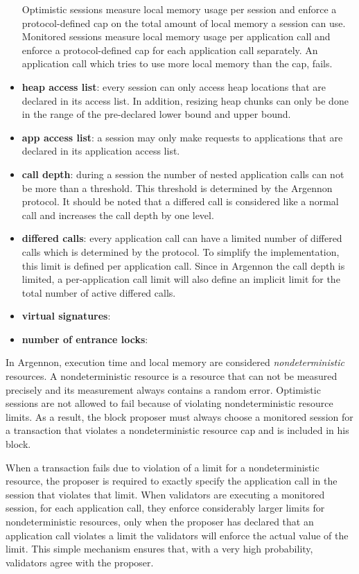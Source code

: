 \begin{itemize}
    Optimistic sessions measure local memory usage per session and enforce a protocol-defined cap on the total amount
    of local memory a session can use. Monitored sessions measure local memory usage per
    application call and enforce a protocol-defined cap for each application call separately. An application call
    which tries to use more local memory than the cap, fails.
    \item \textbf{heap access list}:
    every session can only access heap locations that are declared in its access list. In addition,
    resizing heap chunks can only be done in the range of the pre-declared lower bound and upper bound.
    \item \textbf{app access list}:
    a session may only make requests to applications that are declared in its application access list.
    \item \textbf{call depth}:
    during a session the number of nested application calls can not be more than a threshold. This threshold is
    determined by the Argennon protocol. It should be noted that a differed call is considered like a normal call and
    increases the call depth by one level.
    \item \textbf{differed calls}:
    every application call can have a limited number of differed calls which is determined by the protocol.
    To simplify the implementation, this limit is defined per application call. Since in Argennon the call depth is
    limited, a per-application call limit will also define an implicit limit for the total number of active differed
    calls.
    \item \textbf{virtual signatures}:
    \item \textbf{number of entrance locks}:
\end{itemize}

In Argennon, execution time and local memory are considered \emph{nondeterministic} resources. A nondeterministic
resource is a resource that can not be measured precisely and its measurement always contains a random error.
Optimistic sessions are not allowed to fail because of violating nondeterministic resource limits. As a result, the
block proposer must always choose a monitored session for a transaction that violates a nondeterministic resource cap
and is included in his block.

When a transaction fails due to violation of a limit for a nondeterministic resource, the proposer is
required to exactly specify the application call in the session that violates that limit. When validators are
executing a monitored session, for each application call, they enforce considerably larger limits for
nondeterministic resources, only when the proposer has declared that an application call violates a limit the
validators will enforce the actual value of the limit. This simple mechanism ensures that, with a very high
probability, validators agree with the proposer.


